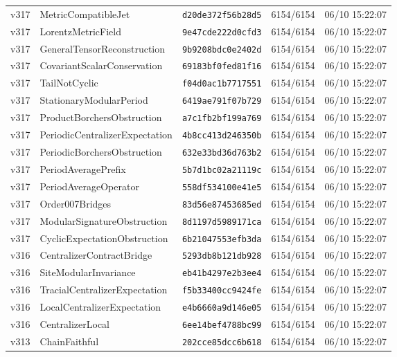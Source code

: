 \documentclass[11pt]{article}
\theoremstyle{definition}\newtheorem{deriv}{Derivação}
\begin{document}
{\begin{longtable}{@{}lllll@{}}
v317 & MetricCompatibleJet & \texttt{d20de372f56b28d5} & 6154/6154 & 06/10 15:22:07 \\
v317 & LorentzMetricField & \texttt{9e47cde222d0cfd3} & 6154/6154 & 06/10 15:22:07 \\
v317 & GeneralTensorReconstruction & \texttt{9b9208bdc0e2402d} & 6154/6154 & 06/10 15:22:07 \\
v317 & CovariantScalarConservation & \texttt{69183bf0fed81f16} & 6154/6154 & 06/10 15:22:07 \\
v317 & TailNotCyclic & \texttt{f04d0ac1b7717551} & 6154/6154 & 06/10 15:22:07 \\
v317 & StationaryModularPeriod & \texttt{6419ae791f07b729} & 6154/6154 & 06/10 15:22:07 \\
v317 & ProductBorchersObstruction & \texttt{a7c1fb2bf199a769} & 6154/6154 & 06/10 15:22:07 \\
v317 & PeriodicCentralizerExpectation & \texttt{4b8cc413d246350b} & 6154/6154 & 06/10 15:22:07 \\
v317 & PeriodicBorchersObstruction & \texttt{632e33bd36d763b2} & 6154/6154 & 06/10 15:22:07 \\
v317 & PeriodAveragePrefix & \texttt{5b7d1bc02a21119c} & 6154/6154 & 06/10 15:22:07 \\
v317 & PeriodAverageOperator & \texttt{558df534100e41e5} & 6154/6154 & 06/10 15:22:07 \\
v317 & Order007Bridges & \texttt{83d56e87453685ed} & 6154/6154 & 06/10 15:22:07 \\
v317 & ModularSignatureObstruction & \texttt{8d1197d5989171ca} & 6154/6154 & 06/10 15:22:07 \\
v317 & CyclicExpectationObstruction & \texttt{6b21047553efb3da} & 6154/6154 & 06/10 15:22:07 \\
v316 & CentralizerContractBridge & \texttt{5293db8b121db928} & 6154/6154 & 06/10 15:22:07 \\
v316 & SiteModularInvariance & \texttt{eb41b4297e2b3ee4} & 6154/6154 & 06/10 15:22:07 \\
v316 & TracialCentralizerExpectation & \texttt{f5b33400cc9424fe} & 6154/6154 & 06/10 15:22:07 \\
v316 & LocalCentralizerExpectation & \texttt{e4b6660a9d146e05} & 6154/6154 & 06/10 15:22:07 \\
v316 & CentralizerLocal & \texttt{6ee14bef4788bc99} & 6154/6154 & 06/10 15:22:07 \\
v313 & ChainFaithful & \texttt{202cce85dcc6b618} & 6154/6154 & 06/10 15:22:07 \\

\end{longtable}}
\end{document}
